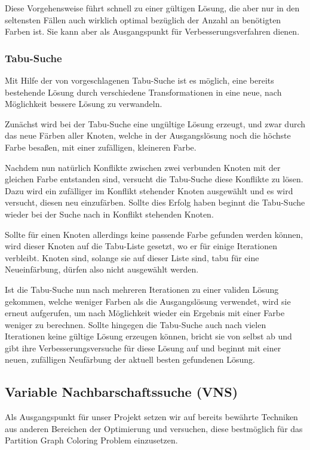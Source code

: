 \documentclass[paper=a4,fontsize=12pt]{scrartcl}
\begin{document}
Diese Vorgehensweise führt schnell zu einer gültigen Lösung, die aber nur in den seltensten Fällen auch wirklich optimal bezüglich der Anzahl an benötigten Farben ist. Sie kann aber als Ausgangspunkt für Verbesserungsverfahren dienen.
 
\subsubsection{Tabu-Suche}
Mit Hilfe der von \citet*{Noronha2006} vorgeschlagenen Tabu-Suche ist es möglich, eine bereits bestehende Lösung durch verschiedene Transformationen in eine neue, nach Möglichkeit bessere Lösung zu verwandeln.

Zunächst wird bei der Tabu-Suche eine ungültige Lösung erzeugt, und zwar durch das neue Färben aller Knoten, welche in der Ausgangslösung noch die höchste Farbe besaßen, mit einer zufälligen, kleineren Farbe.

Nachdem nun natürlich Konflikte zwischen zwei verbunden Knoten mit der gleichen Farbe entstanden sind, versucht die Tabu-Suche diese Konflikte zu lösen. Dazu wird ein zufälliger im Konflikt stehender Knoten ausgewählt und es wird versucht, diesen neu einzufärben. Sollte dies Erfolg haben beginnt die Tabu-Suche wieder bei der Suche nach in Konflikt stehenden Knoten.

Sollte für einen Knoten allerdings keine passende Farbe gefunden werden können, wird dieser Knoten auf die Tabu-Liste gesetzt, wo er für einige Iterationen verbleibt. Knoten sind, solange sie auf dieser Liste sind, tabu für eine Neueinfärbung, dürfen also nicht ausgewählt werden.

Ist die Tabu-Suche nun nach mehreren Iterationen zu einer validen Lösung gekommen, welche weniger Farben als die Ausgangslösung verwendet, wird sie erneut aufgerufen, um nach Möglichkeit wieder ein Ergebnis mit einer Farbe weniger zu berechnen.
Sollte hingegen die Tabu-Suche auch nach vielen Iterationen keine gültige Lösung erzeugen können, bricht sie von selbst ab und gibt ihre Verbesserungsversuche für diese Lösung auf und beginnt mit einer neuen, zufälligen Neufärbung der aktuell besten gefundenen Lösung.

\subsection{Variable Nachbarschaftssuche (VNS)}
Als Ausgangspunkt für unser Projekt setzen wir auf bereits bewährte Techniken aus anderen Bereichen der Optimierung und versuchen, diese bestmöglich für das Partition Graph Coloring Problem einzusetzen.
\end{document}
